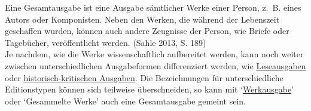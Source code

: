 \documentclass{article}
\begin{document}
    Eine Gesamtausgabe ist eine Ausgabe sämtlicher Werke einer Person, z. B. eines Autors oder Komponisten. Neben den Werken, die während der Lebenszeit geschaffen wurden, können auch andere Zeugnisse der Person, wie Briefe oder Tagebücher, veröffentlicht werden. (Sahle 2013, S. 189)\\
            
        Je nachdem, wie die Werke wissenschaftlich aufbereitet werden, kann noch weiter zwischen unterschiedlichen Ausgabeformen differenziert werden, wie \href{http://gams.uni-graz.at/o:konde.116}{Leseausgaben} oder \href{http://gams.uni-graz.at/o:konde.93}{historisch-kritischen Ausgaben}. Die Bezeichnungen für unterschiedliche Editionstypen können sich teilweise überschneiden, so kann mit ‘\href{http://gams.uni-graz.at/o:konde.213}{Werkausgabe}’ oder ‘Gesammelte Werke’ auch eine Gesamtausgabe gemeint sein.\\
            
\end{document}
